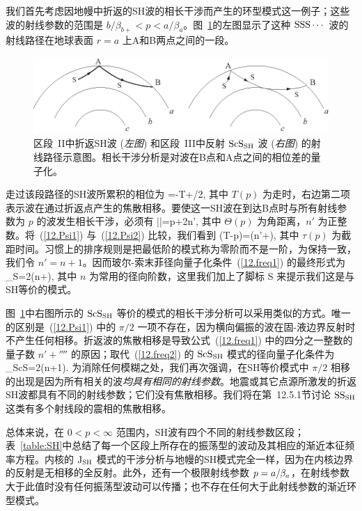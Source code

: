 我们首先考虑因地幔中折返的SH波的相长干涉而产生的环型模式这一例子；这些波的射线参数的范围是 $b/\beta_{b+}<p<a/\beta_a$。图~\ref{12.fig.zhao1}的左图显示了这种 ${\rm SSS}\cdots$ 波的射线路径在地球表面 $r=a$ 上A和B两点之间的一段。
\begin{figure}
\begin{center}
\includegraphics{../figures/chap12/fig10.eps}
\end{center}
\caption[S&ScSFeynman]{\label{12.fig.zhao1}
区段~II中折返SH波 ({\em 左图\/}) 和区段~III中反射 ${\rm ScS}_{\rm SH}$ 波
({\em 右图\/}) 的射线路径示意图。相长干涉分析是对波在B点和A点之间的相位差的量子化。}
\end{figure}
走过该段路径的SH波所累积的相位为
\eq \label{12.Psi1}
\Delta\Psi=-\omega T+\pi/2,
\en
其中 $T(p)$ 为走时，右边第二项表示波在通过折返点产生的焦散相移。要使这一SH波在到达B点时与所有射线参数为 $p$ 的波发生相长干涉，必须有
\eq \label{12.Psi2}
|\Delta\Psi|=\omega p\Theta+2n'\pi,
\en
其中 $\Theta(p)$ 为角距离，$n'$ 为正整数。将~(\ref{12.Psi1}) 与~(\ref{12.Psi2}) 比较，我们看到
\eq \label{12.freq1}
\omega(T-p\Theta)=\omega{}\pi(n'+\fourth),
\en
其中 $\tau(p)$ 为截距时间。习惯上的排序规则是把最低阶的模式称为零阶而不是一阶，为保持一致，我们令 $n'=n+1$。因而玻尔-索末菲径向量子化条件~(\ref{12.freq1}) 的最终形式为
\eq \label{12.freq2}
\omega\tau_{\rm S}=2\pi(n+\fivefourths),
\en
其中 $n$ 为常用的径向阶数，这里我们加上了脚标 S 来提示我们这是与SH等价的模式。

图~\ref{12.fig.zhao1}中右图所示的 ${\rm ScS}_{\rm SH}$ 等价的模式的相长干涉分析可以采用类似的方式。唯一的区别是~(\ref{12.Psi1}) 中的 $\pi/2$ 一项不存在，因为横向偏振的波在固-液边界反射时不产生任何相移。折返波的焦散相移是导致公式~(\ref{12.freq1}) 中的四分之一整数的量子数
$n'+\fourth$ 的原因；取代~(\ref{12.freq2}) 的 ${\rm ScS}_{\rm SH}$ 模式的径向量子化条件为
\eq \label{12.freq3}
\omega\tau_{\rm ScS}=2\pi(n+1).
\en
为消除任何模糊之处，我们再次强调，在SH等价模式中 $\pi/2$ 相移的出现是因为所有相关的波{\em 均具有相同的射线参数\/}。地震或其它点源所激发的折返SH波都具有不同的射线参数；它们没有焦散相移。我们将在第~12.5.1节讨论 ${\rm SS}_{\rm SH}$ 这类有多个射线段的震相的焦散相移。

总体来说，在 $0< p< \infty$ 范围内，SH波有四个不同的射线参数区段；表~\ref{table:SH}中总结了每一个区段上所存在的振荡型的波动及其相应的渐近本征频率方程。内核的 ${\rm J}_{\rm SH}$ 模式的干涉分析与地幔的SH模式完全一样，因为在内核边界的反射是无相移的全反射。此外，还有一个极限射线参数 $p=a/\hspace{-0.2 mm}\beta_a$，在射线参数大于此值时没有任何振荡型波动可以传播；也不存在任何大于此射线参数的渐近环型模式。

